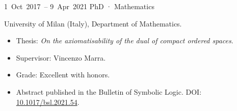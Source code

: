 
\chronorow
  {1~Oct~2017~--\allowbreak{} 9~Apr~2021}
  {PhD · Mathematics}
  {\textcolor{secondary}{University of Milan (Italy), Department of Mathematics.}
   \begin{itemize}
     \item {Thesis: \emph{On the axiomatisability of the dual of compact ordered spaces}.}
     \item {Supervisor: Vincenzo Marra.}
     \item {Grade: Excellent with honors.}
     \item Abstract published in the Bulletin of Symbolic Logic. DOI:
       \href{https://doi.org/10.1017/bsl.2021.54}{10.1017/bsl.2021.54}.
   \end{itemize}}
